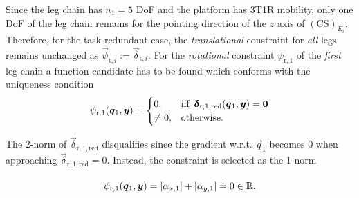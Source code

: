 \documentclass[
	graybox,
	vecphys] %
	{svmult}
\newcommand{\ks}[1]{{(\mathrm{CS})}_{#1}}
\newcommand{\Res}[0]{\vec{\delta}}
\newcommand{\vecResR}[0]{\vec{\psi}}
\newcommand{\ResR}[0]{\psi}
\begin{document}
\vspace{0.1cm} %
Since the leg chain has $n_1=5$ DoF and the platform has 3T1R mobility, only one DoF of the leg chain remains for the pointing direction of the $z$ axis of $\ks{E_i}$.
Therefore, for the task-redundant case, the \emph{translational} constraint for \emph{all} legs remains unchanged as $\vecResR_{\mathrm{t},i}:=\Res_{\mathrm{t},i}$.
For the \emph{rotational} constraint $\ResR_{\mathrm{r},1}$ of the \emph{first} leg chain a function candidate has to be found which conforms with the uniqueness condition
%
\vspace{-0.1cm}
\begin{equation}
	\ResR_{\mathrm{r},1}(\vec{q}_1,\vec{y})=
	\begin{cases}
		0,& \text{iff} \enspace \Res_{\mathrm{r},1,\mathrm{red}}(\vec{q}_1,\vec{y})=\vec{0} \\
		\ne 0,              & \text{otherwise.}
	\end{cases}
	\vspace{-0.1cm}
\end{equation}

The 2-norm of $\Res_{\mathrm{r},1,\mathrm{red}}$ disqualifies since the gradient w.r.t. $\vec{q}_1$ becomes 0 when approaching $\Res_{\mathrm{r},1,\mathrm{red}}=0$.
Instead, the constraint is selected as the 1-norm 


%
\vspace{-0.2cm}
\begin{equation}
\ResR_{\mathrm{r},1}(\vec{q}_1,\vec{y})
=
|\alpha_{x,1}| + |\alpha_{y,1}|
\overset{!}{=}
0
\in {\mathbb{R}}.
\label{eq:constr_rot_red_lead}
\vspace{-0.1cm}
\end{equation}
\end{document}
